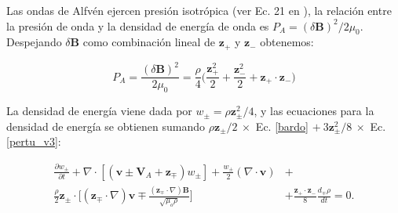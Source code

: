 \documentclass[a4paper,11pt]{report}
\begin{document}
Las ondas de Alfvén ejercen presión isotrópica (ver Ec. 21 en \citet{jacques_1977}), la relación entre la presión de onda y la densidad de energía de onda es $P_A = (\delta \boldsymbol{B})^2/2\mu_0$. Despejando $\delta \boldsymbol{B}$ como combinación lineal de $\boldsymbol{z}_+$ y $\boldsymbol{z}_-$ obtenemos:

\begin{equation}
  P_A = \frac{(\delta \boldsymbol{B})^2}{2\mu_0} = \frac{\rho}{4} \Bigg( \frac{\boldsymbol{z}_+^2}{2}+ \frac{\boldsymbol{z}_-^2}{2}+\boldsymbol{z}_+\cdot\boldsymbol{z}_- \Bigg)
\end{equation}


La densidad de energía viene dada por $w_\pm = \rho \boldsymbol{z}_\pm ^2/4$, y las ecuaciones para la densidad de energía se obtienen sumando $\rho \boldsymbol{z}_\pm/2 ~\times$ Ec. \ref{bardo} $+ ~3\boldsymbol{z}_\pm^2/8 ~\times$ Ec. \ref{pertu_v3}:

\begin{equation}
\begin{split} 
\frac{\partial w_\pm}{\partial t} + \nabla \cdot [(\boldsymbol{v} \pm \boldsymbol{V}_A+\boldsymbol{z}_\mp)w_\pm] + \frac{w_\pm}{2}(\nabla \cdot \boldsymbol{v}) &+ \\
\frac{\rho}{2}\boldsymbol{z}_\pm \cdot \Bigg[(\boldsymbol{z}_\mp\cdot \nabla)\boldsymbol{v} \mp \frac{(\boldsymbol{z}_\mp \cdot \nabla) \boldsymbol{B}}{\sqrt{\mu_o \rho}} \Bigg] &+ \frac{\boldsymbol{z}_+\cdot \boldsymbol{z}_-}{8}\frac{d_\mp \rho}{dt}=0. \label{bardo2}
\end{split}
\end{equation}
\end{document}

